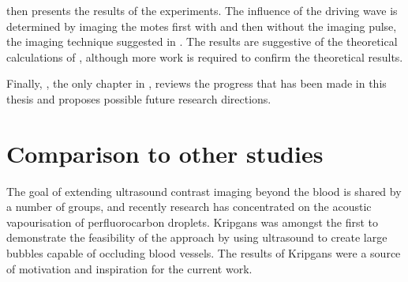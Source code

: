  then presents the results of the experiments.
The influence of the driving wave is determined by 
imaging the motes first with and then without the imaging pulse,
the imaging technique suggested in .
The results are suggestive of the
theoretical calculations of ,
although more work is required to confirm the theoretical results.



Finally, , the only chapter in ,
reviews the progress that has been made in this thesis
and proposes possible future research directions.



\section{Comparison to other studies}

The goal of extending ultrasound contrast imaging beyond the blood is shared by a number of groups,
and recently research has concentrated on the acoustic vapourisation of perfluorocarbon droplets\cite{Burns2010,Rapoport2007,Fabiilli2010,Giesecke2003,Couture2006,Sheeran2013,Doinikov2014,Shpak2013,Lin2013}.
Kripgans\cite{Kripfgans2000, Kripfgans2002,Kripfgans2004} was amongst the first 
to demonstrate the feasibility of the approach %
by using ultrasound to create large bubbles capable of occluding blood vessels.
The results of Kripgans were a source of motivation and inspiration for the current work.



